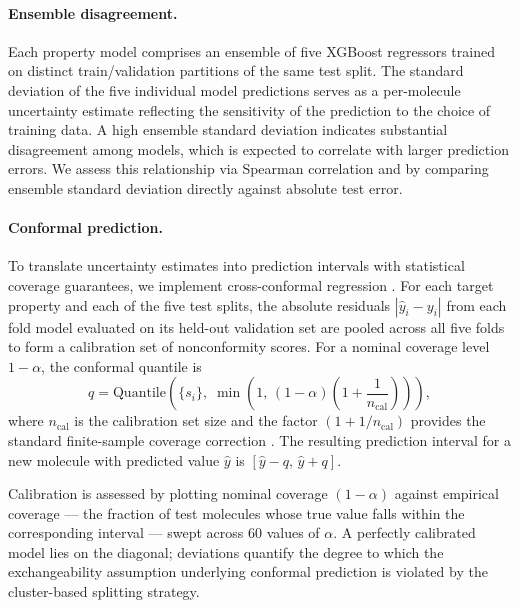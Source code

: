 \documentclass[11pt]{aime}
\begin{document}
\paragraph{Ensemble disagreement.}
Each property model comprises an ensemble of five XGBoost regressors trained on distinct train/validation partitions of the same test split.
The standard deviation of the five individual model predictions serves as a per-molecule uncertainty estimate reflecting the sensitivity of the prediction to the choice of training data.
A high ensemble standard deviation indicates substantial disagreement among models, which is expected to correlate with larger prediction errors.
We assess this relationship via Spearman correlation and by comparing ensemble standard deviation directly against absolute test error.

\paragraph{Conformal prediction.}
To translate uncertainty estimates into prediction intervals with statistical coverage guarantees, we implement cross-conformal regression \cite{vovk_algorithmic_2005,angelopoulos_gentle_2023}.
For each target property and each of the five test splits, the absolute residuals $|\hat{y}_i - y_i|$ from each fold model evaluated on its held-out validation set are pooled across all five folds to form a calibration set of nonconformity scores.
For a nominal coverage level $1-\alpha$, the conformal quantile is
\begin{equation}
    q = \mathrm{Quantile}\!\left(\{s_i\},\;\min\!\left(1,\,(1-\alpha)\!\left(1+\frac{1}{n_\mathrm{cal}}\right)\right)\right),
    \label{eq:conformal_quantile}
\end{equation}
where $n_\mathrm{cal}$ is the calibration set size and the factor $(1+1/n_\mathrm{cal})$ provides the standard finite-sample coverage correction \cite{angelopoulos_gentle_2023}.
The resulting prediction interval for a new molecule with predicted value $\hat{y}$ is $[\hat{y}-q,\,\hat{y}+q]$.

Calibration is assessed by plotting nominal coverage $(1-\alpha)$ against empirical coverage --- the fraction of test molecules whose true value falls within the corresponding interval --- swept across 60 values of $\alpha$.
A perfectly calibrated model lies on the diagonal;
deviations quantify the degree to which the exchangeability assumption underlying conformal prediction is violated by the cluster-based splitting strategy.
\end{document}
